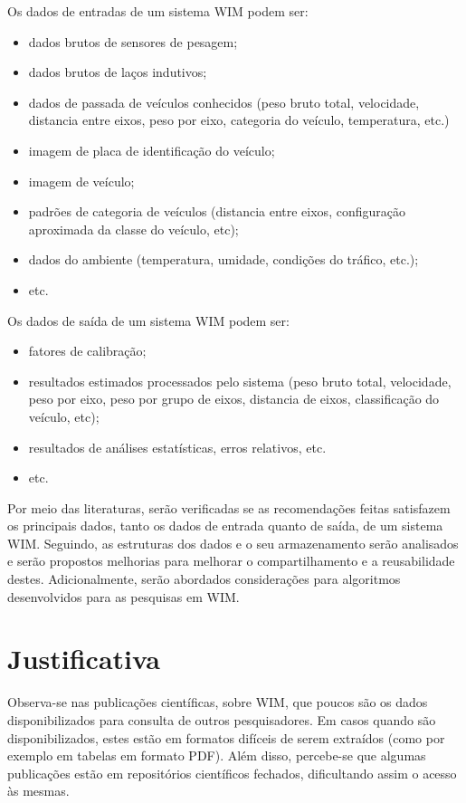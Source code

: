 \documentclass{ufscThesis}
\begin{document}
Os dados de entradas de um sistema WIM podem ser:
\begin{itemize}
\item dados brutos de sensores de pesagem;
\item dados brutos de laços indutivos;
\item dados de passada de veículos conhecidos (peso bruto total, velocidade, distancia entre eixos, peso por eixo, categoria do veículo, temperatura, etc.)
\item imagem de placa de identificação do veículo;
\item imagem de veículo;
\item padrões de categoria de veículos (distancia entre eixos, configuração aproximada da classe do veículo, etc);
\item dados do ambiente (temperatura, umidade, condições do tráfico, etc.);
\item etc.
\end{itemize}

Os dados de saída de um sistema WIM podem ser:
\begin{itemize}
\item fatores de calibração;
\item resultados estimados processados pelo sistema (peso bruto total, velocidade, peso por eixo, peso por grupo de eixos, distancia de eixos, classificação do veículo, etc);
\item resultados de análises estatísticas, erros relativos, etc.
\item etc.
\end{itemize}

Por meio das literaturas, serão verificadas se as recomendações feitas satisfazem os principais dados, tanto os dados de entrada quanto de saída, de um sistema WIM. Seguindo, as estruturas dos dados e o seu armazenamento serão analisados e serão propostos melhorias para melhorar o compartilhamento e a reusabilidade destes. Adicionalmente, serão abordados considerações para algoritmos desenvolvidos para as pesquisas em WIM.


\section{Justificativa}\label{introducao-justificativa}

Observa-se nas publicações científicas, sobre WIM, que poucos são os dados disponibilizados para consulta de outros pesquisadores. Em casos quando são disponibilizados, estes estão em formatos difíceis de serem extraídos (como por exemplo em tabelas em formato PDF). Além disso, percebe-se que algumas publicações estão em repositórios científicos fechados, dificultando assim o acesso às mesmas.
\end{document}
